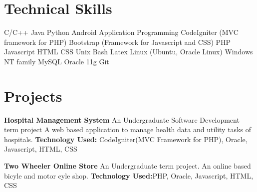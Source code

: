 \documentclass[11pt,a4paper,sans]{moderncv}
\begin{document}
\section{Technical Skills}
{
C/C++
\newline Java
\newline Python
\newline Android Application Programming 
}
{
CodeIgniter (MVC framework for PHP)
\newline Bootstrap (Framework for Javascript and CSS)
\newline PHP
\newline Javascript
\newline HTML
\newline CSS
}
{
Unix Bash
\newline Latex
}
{
Linux (Ubuntu, Oracle Linux)
\newline Windows NT family
}
{
MySQL
\newline Oracle 11g
}
{
Git
}


\section{Projects}
{
\textbf{Hospital Management System}
\newline
An Undergraduate Software Development term project \newline
A web based application to manage health data and utility tasks of hospitals.
\newline \textbf{Technology Used: } CodeIgniter(MVC Framework for PHP), Oracle, Javascript, HTML, CSS
\newline}


{
\textbf{Two Wheeler Online Store}
\newline
An Undergraduate term project. An online based bicyle and motor cyle shop.
\newline \textbf{Technology Used:}PHP, Oracle, Javascript, HTML, CSS
\newline
}
\end{document}
